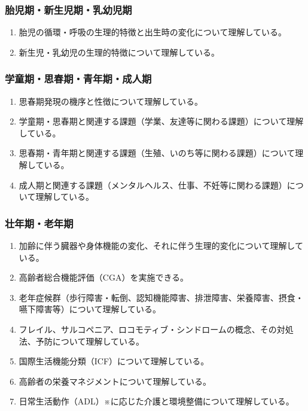 \hypertarget{ux80ceux5150ux671fux65b0ux751fux5150ux671fux4e73ux5e7cux5150ux671f}{%
\subsubsection{胎児期・新生児期・乳幼児期}\label{ux80ceux5150ux671fux65b0ux751fux5150ux671fux4e73ux5e7cux5150ux671f}}

\begin{enumerate}
\def\labelenumi{\arabic{enumi}.}
\tightlist
\item
  胎児の循環・呼吸の生理的特徴と出生時の変化について理解している。
\item
  新生児・乳幼児の生理的特徴について理解している。
\end{enumerate}

\hypertarget{ux5b66ux7ae5ux671fux601dux6625ux671fux9752ux5e74ux671fux6210ux4ebaux671f}{%
\subsubsection{学童期・思春期・青年期・成人期}\label{ux5b66ux7ae5ux671fux601dux6625ux671fux9752ux5e74ux671fux6210ux4ebaux671f}}

\begin{enumerate}
\def\labelenumi{\arabic{enumi}.}
\tightlist
\item
  思春期発現の機序と性徴について理解している。
\item
  学童期・思春期と関連する課題（学業、友達等に関わる課題）について理解している。
\item
  思春期・青年期と関連する課題（生殖、いのち等に関わる課題）について理解している。
\item
  成人期と関連する課題（メンタルヘルス、仕事、不妊等に関わる課題）について理解している。
\end{enumerate}

\hypertarget{ux58eeux5e74ux671fux8001ux5e74ux671f}{%
\subsubsection{壮年期・老年期}\label{ux58eeux5e74ux671fux8001ux5e74ux671f}}

\begin{enumerate}
\def\labelenumi{\arabic{enumi}.}
\tightlist
\item
  加齢に伴う臓器や身体機能の変化、それに伴う生理的変化について理解している。
\item
  高齢者総合機能評価（CGA）を実施できる。
\item
  老年症候群（歩行障害・転倒、認知機能障害、排泄障害、栄養障害、摂食・嚥下障害等）について理解している。
\item
  フレイル、サルコペニア、ロコモティブ・シンドロームの概念、その対処法、予防について理解している。
\item
  国際生活機能分類（ICF）について理解している。
\item
  高齢者の栄養マネジメントについて理解している。
\item
  日常生活動作（ADL）※に応じた介護と環境整備について理解している。
\end{enumerate}

